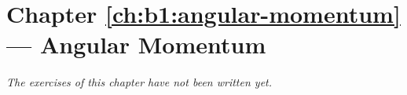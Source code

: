 \section*{Chapter \ref{ch:b1:angular-momentum} --- Angular Momentum}


\emph{The exercises of this chapter have not been written yet.}
